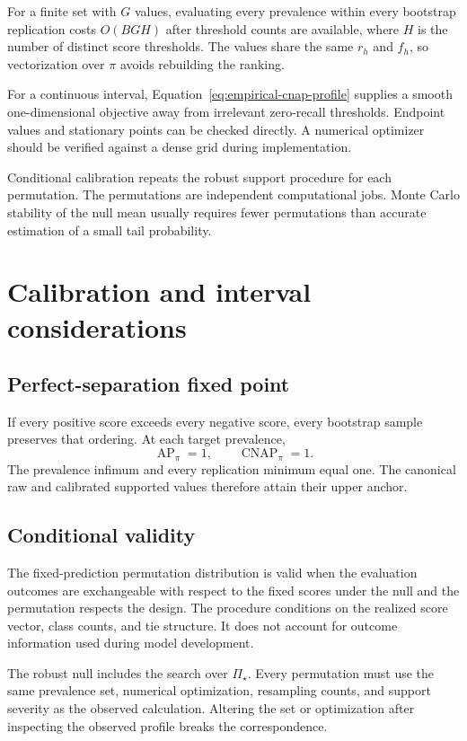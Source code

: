 \documentclass[11pt]{article}
\newcommand{\AP}{\operatorname{AP}}
\newcommand{\CNAP}{\operatorname{CNAP}}
\newcommand{\PSet}{\Pi_\star}
\theoremstyle{remark}
\begin{document}
For a finite set with $G$ values, evaluating every prevalence within every bootstrap replication costs $O(BGH)$ after threshold counts are available, where $H$ is the number of distinct score thresholds. The values share the same $r_h$ and $f_h$, so vectorization over $\pi$ avoids rebuilding the ranking.

For a continuous interval, Equation~\eqref{eq:empirical-cnap-profile} supplies a smooth one-dimensional objective away from irrelevant zero-recall thresholds. Endpoint values and stationary points can be checked directly. A numerical optimizer should be verified against a dense grid during implementation.

Conditional calibration repeats the robust support procedure for each permutation. The permutations are independent computational jobs. Monte Carlo stability of the null mean usually requires fewer permutations than accurate estimation of a small tail probability.

\section{Calibration and interval considerations}
\label{app:calibration}

\subsection{Perfect-separation fixed point}

If every positive score exceeds every negative score, every bootstrap sample preserves that ordering. At each target prevalence,
\[
\AP_\pi=1,
\qquad
\CNAP_\pi=1.
\]
The prevalence infimum and every replication minimum equal one. The canonical raw and calibrated supported values therefore attain their upper anchor.

\subsection{Conditional validity}

The fixed-prediction permutation distribution is valid when the evaluation outcomes are exchangeable with respect to the fixed scores under the null and the permutation respects the design. The procedure conditions on the realized score vector, class counts, and tie structure. It does not account for outcome information used during model development.

The robust null includes the search over $\PSet$. Every permutation must use the same prevalence set, numerical optimization, resampling counts, and support severity as the observed calculation. Altering the set or optimization after inspecting the observed profile breaks the correspondence.
\end{document}
